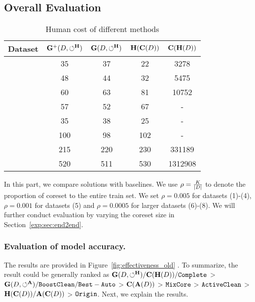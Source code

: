 


\subsection{Overall Evaluation}\label{exp:sec:overall}

\begin{table}
	\centering
	\caption{Human cost of different methods}
	\vspace{-1.2em}
	\small
	\begin{tabular}{ccccc}
		\hline
		Dataset & $\mathbf{G}^+(D,\circlearrowleft^\mathbf{H})$ & $\mathbf{G}(D,\circlearrowleft^\mathbf{H})$ & $\mathbf{H}(\mathbf{C}(D))$ & $\mathbf{C}(\mathbf{H}(D))$\\
		\hline
		\nursery & 35 & 37 & 22 & 3278\\
		\hr & 48 & 44 & 32 & 5475\\
		\adult & 60 & 63 & 81 & 10752\\
		\credit & 57 & 52 & 67 & -\\
		\bike & 35 & 38 & 25 & -\\
		\air & 100 & 98 & 102 & -\\
		\imdb & 215 & 220 & 230 & 331189\\
		\imdbl & 520 & 511 & 530 & 1312908 \\
		\hline
	\end{tabular}
	\label{tbl:humancost}
	\vspace{-1em}
\end{table}





In this part, we compare \ours {} solutions with baselines. We use $\rho = \frac{K}{|D|}$ to denote the proportion of coreset  to the entire train set.  %
We set  $\rho=0.005$ for datasets (1)-(4), $\rho=0.001$ for datasets (5) and  $\rho=0.0005$ for larger datasets (6)-(8).
 We  will further  conduct evaluation by varying the coreset size  in Section~\ref{exp:sec:end2end}.




\subsubsection{Evaluation of model accuracy.}
The results are provided in Figure~\ref{fig:effectiveness_old} . To summarize, the result could be generally ranked as $\mathbf{G}(D,\circlearrowleft^\mathbf{H})/\mathbf{C}(\mathbf{H}(D))/{\tt Complete}$ >  $\mathbf{G}(D,\circlearrowleft^\mathbf{A})/{\tt BoostClean} /{\tt Best-Auto} $ > $\mathbf{C}(\mathbf{A}(D))$ > ${\tt MixCore}$ > ${\tt ActiveClean}$ > $\mathbf{H}(\mathbf{C}(D))/\mathbf{A}(\mathbf{C}(D))$ > ${\tt Origin}$.
Next, we explain the results.

